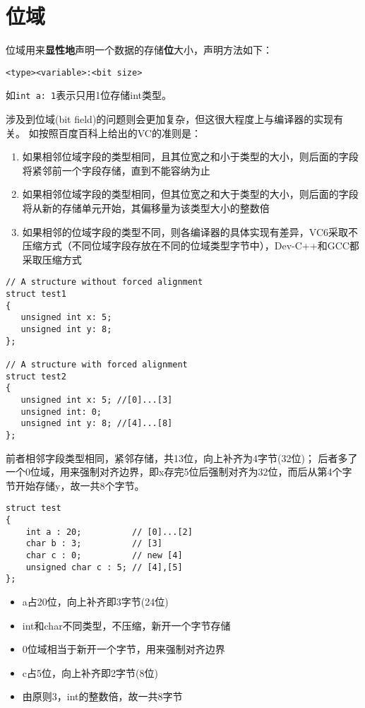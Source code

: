 \documentclass[11pt,UTF8]{ctexart}
\begin{document}
\section{位域}
位域用来\textbf{显性地}声明一个数据的存储\textbf{位}大小，声明方法如下：
\begin{center}
\verb'<type><variable>:<bit size>'
\end{center}
如\verb'int a: 1'表示只用1位存储int类型。

涉及到位域(bit field)的问题则会更加复杂，但这很大程度上与编译器的实现有关。
如按照百度百科上给出的VC的准则是：
\begin{enumerate}
	\itemsep -3pt
	\item 如果相邻位域字段的类型相同，且其位宽之和小于类型的大小，则后面的字段将紧邻前一个字段存储，直到不能容纳为止
	\item 如果相邻位域字段的类型相同，但其位宽之和大于类型的大小，则后面的字段将从新的存储单元开始，其偏移量为该类型大小的整数倍
	\item 如果相邻的位域字段的类型不同，则各编译器的具体实现有差异，VC6采取不压缩方式（不同位域字段存放在不同的位域类型字节中），Dev-C++和GCC都采取压缩方式
\end{enumerate}
\begin{example}
\begin{lstlisting}
// A structure without forced alignment 
struct test1 
{ 
   unsigned int x: 5; 
   unsigned int y: 8; 
}; 
  
// A structure with forced alignment 
struct test2 
{ 
   unsigned int x: 5; //[0]...[3]
   unsigned int: 0; 
   unsigned int y: 8; //[4]...[8]
};
\end{lstlisting}
\end{example}
\begin{analysis}
前者相邻字段类型相同，紧邻存储，共13位，向上补齐为4字节(32位)；
后者多了一个0位域，用来强制对齐边界，即x存完5位后强制对齐为32位，而后从第4个字节开始存储y，故一共8个字节。
\end{analysis}

\begin{example}
\begin{lstlisting}
struct test
{
    int a : 20;          // [0]...[2]
    char b : 3;          // [3]
    char c : 0;          // new [4]
    unsigned char c : 5; // [4],[5]
};
\end{lstlisting}
\end{example}
\begin{analysis}
\begin{itemize}
	\itemsep -3pt
	\item a占20位，向上补齐即3字节(24位)
	\item int和char不同类型，不压缩，新开一个字节存储
	\item 0位域相当于新开一个字节，用来强制对齐边界
	\item c占5位，向上补齐即2字节(8位)
	\item 由原则3，int的整数倍，故一共8字节
\end{itemize}
\end{analysis}
\end{document}
